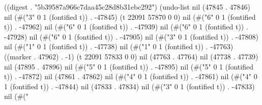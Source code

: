 
((digest . "5b39587a966c7daa45c28d8b31ebc292") (undo-list nil (47845 . 47846) nil (#("3" 0 1 (fontified t)) . -47845) (t 22091 57870 0 0) nil (#("6" 0 1 (fontified t)) . -47962) nil (#("6" 0 1 (fontified t)) . -47939) nil (#("6" 0 1 (fontified t)) . -47928) nil (#("6" 0 1 (fontified t)) . -47905) nil (#("3" 0 1 (fontified t)) . -47808) nil (#("1" 0 1 (fontified t)) . -47738) nil (#("1" 0 1 (fontified t)) . -47763) ((marker . 47962) . -1) (t 22091 57833 0 0) nil (47763 . 47764) nil (47738 . 47739) nil (47895 . 47896) nil (#("5" 0 1 (fontified t)) . -47895) nil (#("5" 0 1 (fontified t)) . -47872) nil (47861 . 47862) nil (#("4" 0 1 (fontified t)) . -47861) nil (#("4" 0 1 (fontified t)) . -47844) nil (47833 . 47834) nil (#("3" 0 1 (fontified t)) . -47833) nil (#("%
